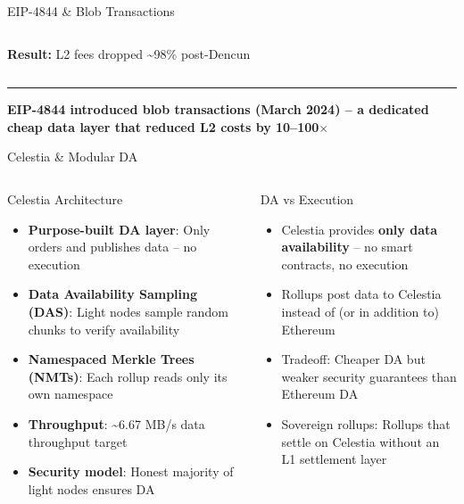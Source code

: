 \documentclass[8pt,aspectratio=169]{beamer}
\newcommand{\bottomnote}[1]{\vfill\vspace{-2mm}\textcolor{mllavender2}{\rule{\textwidth}{0.4pt}}\vspace{1mm}\footnotesize\textbf{#1}}
\begin{document}
\begin{frame}{EIP-4844 \& Blob Transactions}
\begin{columns}[T]
\vspace{1mm}
\begin{center}
\footnotesize\textbf{Result:} L2 fees dropped \textasciitilde98\% post-Dencun
\end{center}
\end{columns}
\bottomnote{EIP-4844 introduced blob transactions (March 2024) -- a dedicated cheap data layer that reduced L2 costs by 10--100$\times$}
\end{frame}

\begin{frame}{Celestia \& Modular DA}
\vspace{-1mm}
\begin{columns}[T]
\begin{block}{Celestia Architecture}
\footnotesize
\begin{itemize}\setlength\itemsep{3pt}
  \item \textbf{Purpose-built DA layer}: Only orders and publishes data -- no execution
  \item \textbf{Data Availability Sampling (DAS)}: Light nodes sample random chunks to verify availability
  \item \textbf{Namespaced Merkle Trees (NMTs)}: Each rollup reads only its own namespace
  \item \textbf{Throughput}: \textasciitilde6.67 MB/s data throughput target
  \item \textbf{Security model}: Honest majority of light nodes ensures DA
\end{itemize}
\end{block}
\vspace{2mm}
\begin{block}{DA vs Execution}
\footnotesize
\begin{itemize}
  \item Celestia provides \textbf{only data availability} -- no smart contracts, no execution
  \item Rollups post data to Celestia instead of (or in addition to) Ethereum
  \item Tradeoff: Cheaper DA but weaker security guarantees than Ethereum DA
  \item Sovereign rollups: Rollups that settle on Celestia without an L1 settlement layer
\end{itemize}
\end{block}
\vspace{1mm}
\end{columns}
\end{frame}
\end{document}
